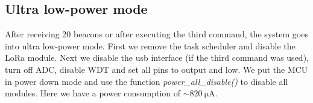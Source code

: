 \documentclass{scrartcl}
\begin{document}
\subsection{Ultra low-power mode}
After receiving 20 beacons or after executing the third command, the system goes into ultra low-power mode.
First we remove the task scheduler and disable the LoRa module.
Next we disable the usb interface (if the third command was used), turn off ADC, disable WDT and set all pins to output and low.
We put the MCU in power down mode and use the function \textit{power\_all\_disable()} to disable all modules.
Here we have a power consumption of $\sim \SI{820}{\micro\ampere}$.
\end{document}
